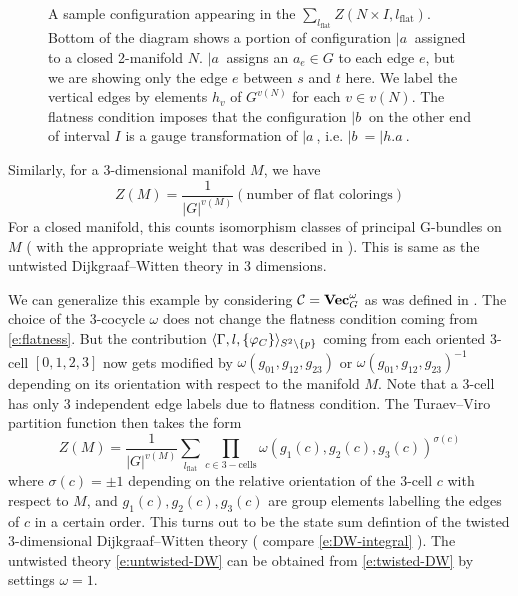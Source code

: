 \begin{figure}[ht]
\caption{A sample configuration appearing in the $\sum_{l_{\mathrm{flat}}} Z(N \times I , l_{\mathrm{flat}} )$. 
	Bottom of the diagram shows a portion of configuration $| a \>$ assigned to a closed 2-manifold $N$. $|a\>$ 
	assigns an $a_e \in G$ to each edge $e$, but we are showing only the edge $e$ between $s$ and $t$ here. 
	We label the vertical edges by elements $h_v$ of $G^{v(N)}$ for each $v \in v(N)$. 
	The flatness condition imposes that the configuration $|b\>$ on the other end of interval $I$ is a 
	gauge transformation of $|a\>$, i.e. $|b\>=|h.a\>$.}
\label{f:flat-guage-configuration}
\end{figure}

Similarly, for a 3-dimensional manifold $M$, we have
\begin{equation}\label{e:untwisted-DW}
	Z(M) = \frac{1}{|G|^{v(M)}} (\text{number of flat colorings})
\end{equation}
For a closed manifold, this counts isomorphism classes of principal G-bundles on $M$ ( with the appropriate
 weight that was described in  ). This is same as the untwisted Dijkgraaf--Witten theory
  in 3 dimensions.


We can generalize this example by considering $\mathcal{C} = \mathbf{Vec}_G^\omega$ as was defined in . 
The choice of the 3-cocycle $\omega$ does not change the flatness condition coming from \eqref{e:flatness}. 
But the contribution $\langle\Gamma,l,\{ \varphi_C\}\rangle_{S^2\setminus\{p\}}$ 
 coming from each oriented 3-cell $[0,1,2,3]$ now gets modified by $\omega(g_{01},g_{12},g_{23})$ or 
 $\omega(g_{01},g_{12},g_{23})^{-1}$ depending on its orientation with respect to the manifold $M$. Note that a 3-cell 
 has only 3 independent edge labels due to flatness condition. The Turaev--Viro partition function then takes the form
\begin{equation}\label{e:twisted-DW}
Z(M) = \frac{1}{|G|^{v(M)}} \sum_{l_\mathrm{flat}} \prod_{c \in \mathrm{3-cells}} \omega(g_1(c),g_2(c),g_3(c))^{\sigma(c)}
\end{equation}
where $\sigma(c) = \pm 1 $ depending on the relative orientation of the 3-cell $c$ with respect to $M$, and 
$g_1(c),g_2(c),g_3(c)$ are group elements labelling the edges of $c$ in a certain order. This turns out to be 
the state sum defintion of the twisted 3-dimensional Dijkgraaf--Witten theory ( compare \eqref{e:DW-integral} ). The
 untwisted theory \eqref{e:untwisted-DW} can be obtained from \eqref{e:twisted-DW} by settings $\omega=1$.



